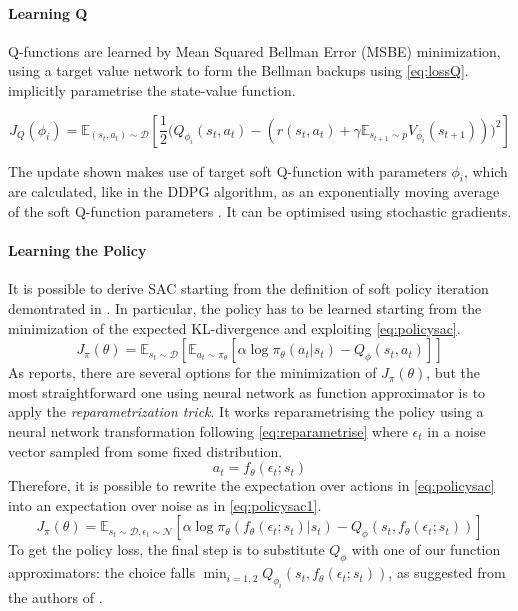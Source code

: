 \paragraph{Learning Q} Q-functions are learned by Mean Squared Bellman Error (MSBE) minimization, using a target value network to form the Bellman backups using \vref{eq:lossQ}.  implicitly parametrise the state-value function.

\begin{equation} \label{eq:lossQ}
J_Q(\phi_i) = \mathbb{E}_{(s_t,a_t) \sim \mathcal D}\left[ \frac{1}{2}\Bigg( Q_{\phi_i}(s_t,a_t) - \left(r(s_t, a_t) + \gamma \mathbb{E}_{s_{t+1} \sim p} V_{\bar{\phi_i}}(s_{t+1}) \right) \Bigg)^2 \right]
\end{equation}


The update shown makes use of target soft Q-function with parameters $\phi_i$, which are calculated, like in the DDPG algorithm, as an exponentially moving average of the soft Q-function parameters \cite{mnih2015human}. It can be optimised using stochastic gradients.

\paragraph{Learning the Policy} It is possible to derive SAC starting from the definition of soft policy iteration demontrated in   \cite[Section 4]{haarnoja2018alg}. In particular, the policy has to be learned starting from the minimization of the expected KL-divergence \cite{kullback1959information,kullback1951information} and exploiting \vref{eq:policysac}.
\begin{equation} \label{eq:policysac}
J_\pi(\theta) = \mathbb{E}_{s_t \sim \mathcal{D}}[\mathbb{E}_{a_t \sim \pi_\theta}[\alpha \log \pi_\theta(a_t|s_t) - Q_\phi(s_t,a_t)]]
\end{equation}
As \cite{haarnoja2018alg} reports, there are several options for the minimization of $J_\pi(\theta)$, but the most straightforward one using neural network as function approximator is to apply the \textit{reparametrization trick}.
It works reparametrising the policy using a neural network transformation following \vref{eq:reparametrise} where $\epsilon_t$ in a noise vector sampled from some fixed distribution.
\begin{equation} \label{eq:reparametrise}
a_t = f_\theta(\epsilon_t; s_t)
\end{equation}
Therefore, it is possible to rewrite the expectation over actions in \vref{eq:policysac} into an expectation over noise as in \vref{eq:policysac1}.
\begin{equation} \label{eq:policysac1}
	J_\pi(\theta) = \mathbb{E}_{s_t \sim \mathcal{D}, \epsilon_t \sim \mathcal{N}}[\alpha \log \pi_\theta(f_\theta(\epsilon_t; s_t)|s_t) - Q_\phi(s_t,f_\theta(\epsilon_t; s_t))]
\end{equation}
To get the policy loss, the final step is to substitute $Q_{\phi}$ with one of our function approximators: the choice falls $\min_{i=1,2}Q_{\phi_i}(s_t, f_\theta(\epsilon_t; s_t))$, as suggested from the authors of \cite{haarnoja2018alg}.

